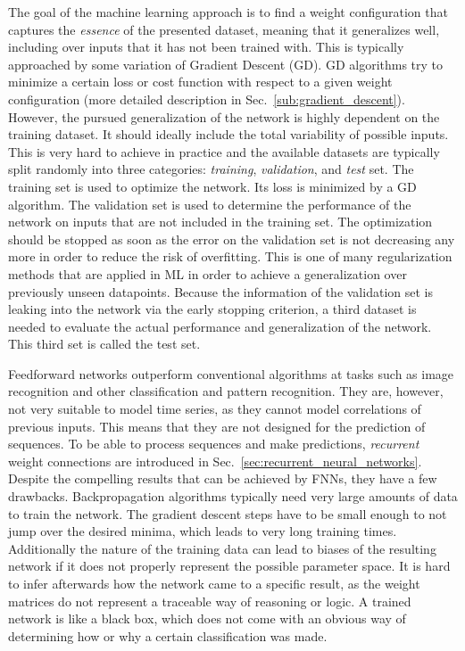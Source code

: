 The goal of the machine learning approach is to find a weight configuration
that captures the \emph{essence} of the presented dataset, meaning that it
generalizes well, including over inputs that it has not been trained with.
This is typically approached by some variation of Gradient Descent (GD). GD
algorithms try to minimize a certain loss or cost function with respect to a
given weight configuration (more detailed description in
Sec.~\ref{sub:gradient_descent}).  However, the pursued generalization of the
network is highly dependent on the training dataset. It should ideally include
the total variability of possible inputs.  This is very hard to achieve in
practice and the available datasets are typically split randomly into three
categories: \emph{training}, \emph{validation}, and \emph{test} set.  The
training set is used to optimize the network. Its loss is minimized by a GD
algorithm. The validation set is used to determine the performance of the
network on inputs that are not included in the training set.  The optimization
should be stopped as soon as the error on the validation set is not decreasing
any more in order to reduce the risk of overfitting. This is one of many
regularization methods that are applied in ML in order to achieve a
generalization over previously unseen datapoints. Because the information of
the validation set is leaking into the network via the early stopping
criterion, a third dataset is needed to evaluate the actual performance and
generalization of the network.  This third set is called the test set.

Feedforward networks outperform conventional algorithms at tasks such as image
recognition and other classification and pattern recognition.  They are,
however, not very suitable to model time series, as they cannot model correlations
of previous inputs. This means that they are not designed for the prediction of
sequences.  To be able to process sequences and make predictions,
\emph{recurrent} weight connections are introduced in
Sec.~\ref{sec:recurrent_neural_networks}.  Despite the compelling results that
can be achieved by FNNs, they have a few drawbacks.  Backpropagation algorithms
typically need very large amounts of data to train the network. The gradient
descent steps have to be small enough to not jump over the desired minima,
which leads to very long training times.  Additionally the nature of the
training data can lead to biases of the resulting network if it does not
properly represent the possible parameter space.  It is hard to infer
afterwards how the network came to a specific result, as the weight matrices do
not represent a traceable way of reasoning or logic.  A trained network is like
a black box, which does not come with an obvious way of determining how or why
a certain classification was made.


